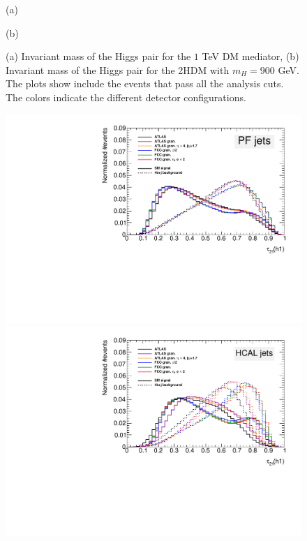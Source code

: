 \begin{figure}
	\begin{minipage}[t]{0.5\textwidth}
		\caption*{(a)}
	\end{minipage}%
	\hfill
	\begin{minipage}[t]{0.5\textwidth}
		\caption*{(b)}
	\end{minipage}
	
	\caption{(a) Invariant mass of the Higgs pair for the $1$ TeV DM mediator, (b) Invariant mass of the Higgs pair for the 2HDM with $m_H=900$ GeV. The plots show include the events that pass all the analysis cuts. The colors indicate the different detector configurations.}
	\label{fig:CompGran1}
\end{figure}

\begin{figure}
	\centering
	\begin{minipage}[t]{.5\textwidth}
		\centering
		\includegraphics[trim={.65cm 0 0 0},clip,width=\linewidth]{./Figures/tau21.pdf}
	\end{minipage}%
	\begin{minipage}[t]{.5\textwidth}
		\centering
		\includegraphics[trim={0 0 .65cm 0},clip,width=\linewidth]{./Figures/tau21CALO.pdf}
	\end{minipage}
	

\end{figure}
